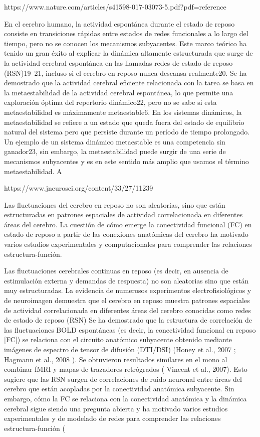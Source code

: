 https://www.nature.com/articles/s41598-017-03073-5.pdf?pdf=reference


En el cerebro humano, la actividad espontánea durante el estado de reposo consiste en transiciones rápidas entre estados de redes funcionales a lo largo del tiempo, pero no se conocen los mecanismos subyacentes. Este marco teórico ha tenido un gran éxito al explicar la dinámica altamente estructurada que surge de la actividad cerebral espontánea en las llamadas redes de estado de reposo (RSN)19–21, incluso si el cerebro en reposo nunca descansa realmente20. Se ha demostrado que la actividad cerebral eficiente relacionada con la tarea se basa en la metaestabilidad de la actividad cerebral espontánea, lo que permite una exploración óptima del repertorio dinámico22, pero no se sabe si esta metaestabilidad es máximamente metaestable6. En los sistemas dinámicos, la metaestabilidad se refiere a un estado que queda fuera del estado de equilibrio natural del sistema pero que persiste durante un período de tiempo prolongado. Un ejemplo de un sistema dinámico metaestable es una competencia sin ganador23, sin embargo, la metaestabilidad puede surgir de una serie de mecanismos subyacentes y es en este sentido más amplio que usamos el término metaestabilidad. A

https://www.jneurosci.org/content/33/27/11239

Las fluctuaciones del cerebro en reposo no son aleatorias, sino que están estructuradas en patrones espaciales de actividad correlacionada en diferentes áreas del cerebro. La cuestión de cómo emerge la conectividad funcional (FC) en estado de reposo a partir de las conexiones anatómicas del cerebro ha motivado varios estudios experimentales y computacionales para comprender las relaciones estructura-función.

Las fluctuaciones cerebrales continuas en reposo (es decir, en ausencia de estimulación externa y demandas de respuesta) no son aleatorias sino que están muy estructuradas. La evidencia de numerosos experimentos electrofisiológicos y de neuroimagen demuestra que el cerebro en reposo muestra patrones espaciales de actividad correlacionada en diferentes áreas del cerebro conocidas como redes de estado de reposo (RSN)  Se ha demostrado que la estructura de correlación de las fluctuaciones BOLD espontáneas (es decir, la conectividad funcional en reposo [FC]) se relaciona con el circuito anatómico subyacente obtenido mediante imágenes de espectro de tensor de difusión (DTI/DSI) (Honey et al., 2007 ; Hagmann et al., 2008 ). Se obtuvieron resultados similares en el mono al combinar fMRI y mapas de trazadores retrógrados ( Vincent et al., 2007). Esto sugiere que las RSN surgen de correlaciones de ruido neuronal entre áreas del cerebro que están acopladas por la conectividad anatómica subyacente. Sin embargo, cómo la FC se relaciona con la conectividad anatómica y la dinámica cerebral sigue siendo una pregunta abierta y ha motivado varios estudios experimentales y de modelado de redes para comprender las relaciones estructura-función (

